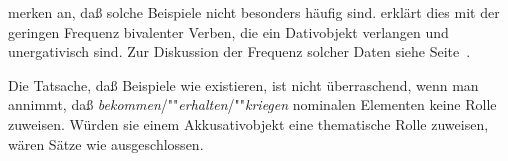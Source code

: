 \noindent
\citet{HW95a} merken an, daß solche Beispiele nicht besonders häufig sind.
\citet[]{Wegener90} erklärt dies mit der geringen Frequenz bivalenter
Verben, die ein Dativobjekt verlangen und unergativisch sind. Zur Diskussion der Frequenz
solcher Daten siehe Seite~\pageref{frequenz-von-korpusbelegen}.


Die Tatsache, daß Beispiele wie  
existieren, ist nicht überraschend, wenn man annimmt, daß
\emph{bekommen}/""\emph{erhalten}/""\emph{kriegen} nominalen Elementen keine Rolle
zuweisen. Würden sie einem Akkusativobjekt eine thematische Rolle zuweisen,
wären Sätze wie  ausgeschlossen.


